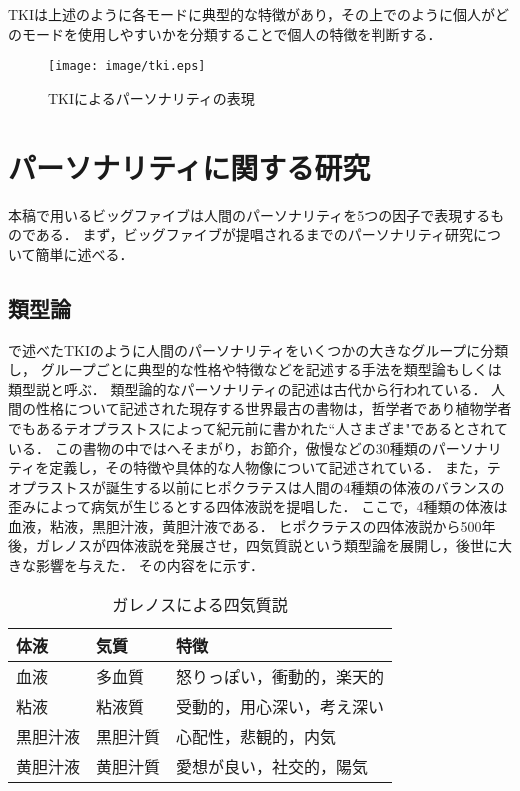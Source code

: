 TKIは上述のように各モードに典型的な特徴があり，その上でのように個人がどのモードを使用しやすいかを分類することで個人の特徴を判断する．
\begin{figure}[htb]
    \centering
    \texttt{[image: image/tki.eps]}
    \caption{TKIによるパーソナリティの表現}
    \label{fig:tki}
\end{figure}

\section{パーソナリティに関する研究}
本稿で用いるビッグファイブは人間のパーソナリティを5つの因子で表現するものである．
まず，ビッグファイブが提唱されるまでのパーソナリティ研究について簡単に述べる\cite{big5-history, psychology, first-personality,daniel}．

\subsection{類型論}
で述べたTKIのように人間のパーソナリティをいくつかの大きなグループに分類し，
グループごとに典型的な性格や特徴などを記述する手法を類型論もしくは類型説と呼ぶ．
類型論的なパーソナリティの記述は古代から行われている．
人間の性格について記述された現存する世界最古の書物は，哲学者であり植物学者でもあるテオプラストスによって紀元前に書かれた“人さまざま"であるとされている．
この書物の中ではへそまがり，お節介，傲慢などの30種類のパーソナリティを定義し，その特徴や具体的な人物像について記述されている\cite{theophrastus}．
また，テオプラストスが誕生する以前にヒポクラテスは人間の4種類の体液のバランスの歪みによって病気が生じるとする四体液説を提唱した\cite{hippocrates}．
ここで，4種類の体液は血液，粘液，黒胆汁液，黄胆汁液である．
ヒポクラテスの四体液説から500年後，ガレノスが四体液説を発展させ，四気質説という類型論を展開し，後世に大きな影響を与えた．
その内容をに示す．

\begin{table}[htb]
    \centering
    \caption{ガレノスによる四気質説}
    \begin{tabular}{lll} \hline
        体液 & 気質 & 特徴 \\ \hline
        血液 & 多血質 & 怒りっぽい，衝動的，楽天的 \\
        粘液 & 粘液質 & 受動的，用心深い，考え深い \\
        黒胆汁液 & 黒胆汁質 & 心配性，悲観的，内気 \\
        黄胆汁液 & 黄胆汁質 & 愛想が良い，社交的，陽気 \\ \hline
    \end{tabular}
    \label{tab:galenos}
\end{table}

